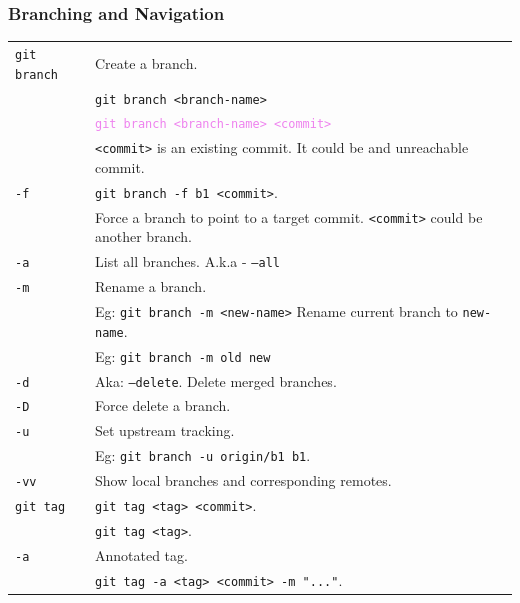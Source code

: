 \subsubsection*{Branching and Navigation}
\begin{tabularx}{\linewidth}{lX}
    \texttt{git branch}     & Create a branch.\\ 
                            & \texttt{git branch <branch-name>}\\
                            & \textcolor{violet}{
                                \texttt{git branch <branch-name> <commit>}}\\
                            & \texttt{<commit>} is an existing commit. 
                                It could be and unreachable commit.\\
    \texttt{-f}             & \texttt{git branch -f b1 <commit>}.\\
                            & Force a branch to point to a target commit.
                                \texttt{<commit>} could be another branch.\\
    \texttt{-a}             & List all branches. A.k.a - \texttt{--all}\\
    \texttt{-m}             & Rename a branch. \\
                            & Eg: \texttt{git branch -m <new-name>}
                                Rename current branch to 
                                \texttt{new-name}.\\
                            & Eg: \texttt{git branch -m old new}\\
    \texttt{-d}             & Aka: \texttt{--delete}. Delete merged branches.\\
    \texttt{-D}             & Force delete a branch.\\
    \texttt{-u}             & Set upstream tracking.\\
                            & Eg: \texttt{git branch -u origin/b1 b1}.\\
    \texttt{-vv}            & Show local branches and corresponding remotes.\\
\hline
    \texttt{git tag}        & \texttt{git tag <tag> <commit>}.\\
                            & \texttt{git tag <tag>}.\\
    \texttt{-a}             & Annotated tag.\\
                            & \texttt{git tag -a <tag> <commit> -m "..."}.\\

\end{tabularx}
